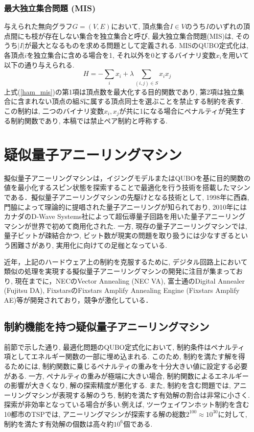 \documentclass[submit,techrep,noauthor]{ipsj}
\begin{document}
\subsubsection{最大独立集合問題 (MIS)}
与えられた無向グラフ$G=(V, E)$において, 頂点集合$I\in V$のうち$I$のいずれの頂点間にも枝が存在しない集合を独立集合と呼び, 最大独立集合問題(MIS)は, そのうち$|I|$が最大となるものを求める問題として定義される. MISのQUBO定式化は, 各頂点$i$を独立集合に含める場合を1, それ以外を0とするバイナリ変数$x_{i}$を用いて以下の通り与えられる.
\begin{equation}
H = -\sum_{i}x_{i} + \lambda\sum_{(i,j)\in S }x_{i}x_{j} \label{ham_mis}
\end{equation}
上式(\ref{ham_mis})の第1項は頂点数を最大化する目的関数であり, 第2項は独立集合に含まれない頂点の組$S$に属する頂点同士を選ぶことを禁止する制約を表す. この制約は, 二つのバイナリ変数$x_{i}, x_{j}$が共に1になる場合にペナルティが発生する制約関数であり, 本稿では禁止ペア制約と呼称する.

\section{疑似量子アニーリングマシン}
擬似量子アニーリングマシンは，イジングモデルまたはQUBOを基に目的関数の値を最小化するスピン状態を探索することで最適化を行う技術を搭載したマシンである．擬似量子アニーリングマシンの先駆けとなる技術として, 1998年に西森, 門脇によって理論的に提唱された量子アニーリング\cite{nishimori}が知られており, 2010年にはカナダのD-Wave Systems社によって超伝導量子回路を用いた量子アニーリングマシンが世界で初めて商用化された\cite{d-wave}. 一方, 現存の量子アニーリングマシンでは, 量子ビットが疎結合かつ, ビット数が現実の問題を取り扱うには少なすぎるという困難さがあり, 実用化に向けての足枷となっている.

近年，上記のハードウェア上の制約を克服するために, デジタル回路上において類似の処理を実現する擬似量子アニーリングマシンの開発に注目が集まっており, 現在までに，NECのVector Annealing (NEC VA)\cite{va}, 富士通のDigital Annealer (Fujitsu DA)\cite{da}, FixstarsのFixstars Amplify Annealing Engine (Fixstars Amplify AE)\cite{amplify}等が開発されており，競争が激化している．

\subsection{制約機能を持つ疑似量子アニーリングマシン}
前節で示した通り, 最適化問題のQUBO定式化において, 制約条件はペナルティ項としてエネルギー関数の一部に埋め込まれる. このため, 制約を満たす解を得るためには, 制約関数に乗じるペナルティの重みを十分大きい値に設定する必要がある. 一方, ペナルティの重みが極端に大きい場合, 制約関数によるエネルギーの影響が大きくなり, 解の探索精度が悪化する. また, 制約を含む問題では, アニーリングマシンが表現する解のうち, 制約を満たす有効解の割合は非常に小さく. 探索が非効率となっている場合が多い.例えば, ツーウェイワンホット制約を含む10都市のTSPでは, アニーリングマシンが探索する解の総数$2^{100}\approx10^{30}$に対して, 制約を満たす有効解の個数は高々約$10^{6}$個である.
\end{document}
